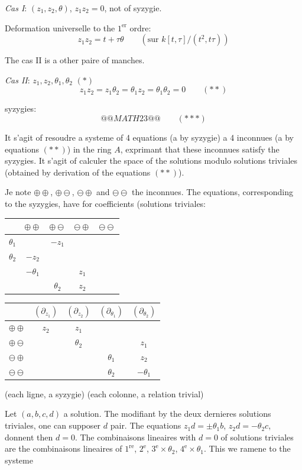 \documentclass[11pt,a4paper]{article}
\theoremstyle{plain}
\theoremstyle{definition}
\begin{document}
\medskip

\noindent \textit{Cas I}: $(z_1, z_2, \theta)$, $z_1 z_2 = 0$, not of syzygie.

Deformation universelle to the $1^{\text{er}}$ ordre:
\[
z_1 z_2 = t + \tau \theta \qquad (\text{sur } k[t,\tau]/(t^2, t\tau))
\]

The cas II is a other paire of manches.

\newpage

\noindent \textit{Cas II}: $z_1, z_2, \theta_1, \theta_2$ \hfill $(*)$
\[
z_1 z_2 = z_1 \theta_2 = \theta_1 z_2 = \theta_1 \theta_2 = 0 \qquad (**)
\]

syzygies:
\[
@@MATH23@@ \qquad (***)
\]

It s'agit of resoudre a systeme of 4 equations (a by syzygie) a 4 inconnues (a by equations $(**)$) in the ring $A$, exprimant that these inconnues satisfy the syzygies. It s'agit of calculer the space of the solutions modulo solutions triviales (obtained by derivation of the equations $(**)$).

Je note $\oplus\oplus$, $\oplus\ominus$, $\ominus\oplus$ and $\ominus\ominus$ the inconnues. The equations, corresponding to the syzygies, have for coefficients (solutions triviales:

\begin{center}
\begin{tabular}{c|cccc}
& $\oplus\oplus$ & $\oplus\ominus$ & $\ominus\oplus$ & $\ominus\ominus$ \\
\hline
$\theta_1$ & & $-z_1$ & & \\
$\theta_2$ & $-z_2$ & & & \\
& $-\theta_1$ & & $z_1$ & \\
& & $\theta_2$ & $z_2$ &
\end{tabular}
\qquad
\begin{tabular}{c|cccc}
& $(\partial_{z_1})$ & $(\partial_{z_2})$ & $(\partial_{\theta_1})$ & $(\partial_{\theta_2})$ \\
\hline
$\oplus\oplus$ & $z_2$ & $z_1$ & & \\
$\oplus\ominus$ & & $\theta_2$ & & $z_1$ \\
$\ominus\oplus$ & & & $\theta_1$ & $z_2$ \\
$\ominus\ominus$ & & & $\theta_2$ & $-\theta_1$
\end{tabular}
\end{center}

(each ligne, a syzygie) \hfill (each colonne, a relation trivial)

Let $(a,b,c,d)$ a solution. The modifiant by the deux dernieres solutions triviales, one can supposer $d$ pair. The equations $z_1 d = \pm \theta_1 b$, $z_2 d = -\theta_2 c$, donnent then $d = 0$. The combinaisons lineaires with $d = 0$ of solutions triviales are the combinaisons lineaires of $1^{\text{re}}$, $2^{\text{e}}$, $3^{\text{e}} \times \theta_2$, $4^{\text{e}} \times \theta_1$. This we ramene to the systeme
\end{document}
